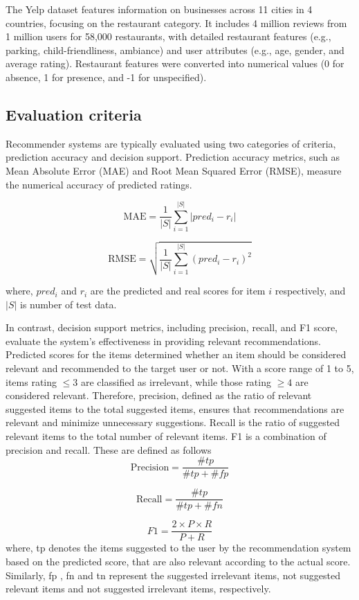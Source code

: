 \documentclass{article}
\begin{document}
The Yelp dataset features information on businesses across 11 cities in 4 countries, focusing on the restaurant category. It includes 4 million reviews from 1 million users for 58,000 restaurants, with detailed restaurant features (e.g., parking, child-friendliness, ambiance) and user attributes (e.g., age, gender, and average rating). Restaurant features were converted into numerical values (0 for absence, 1 for presence, and -1 for unspecified).

\subsection{Evaluation criteria}
Recommender systems are typically evaluated using two categories of criteria, prediction accuracy and decision support. Prediction accuracy metrics, such as Mean Absolute Error (MAE) and Root Mean Squared Error (RMSE), measure the numerical accuracy of predicted ratings. 

\begin{equation}
    \text{MAE} = \frac{1}{|S|} \sum_{i=1}^{|S|} |pred_i - r_i|
\end{equation}


\begin{equation}
    \text{RMSE} = \sqrt{\frac{1}{|S|} \sum_{i=1}^{|S|} (pred_i - r_i)^2}
\end{equation}

where, $pred_i$ and $r_i$ are the predicted and real scores for item $i$ respectively, and $|S|$ is number of test data.

In contrast, decision support metrics, including precision, recall, and F1 score, evaluate the system's effectiveness in providing relevant recommendations. Predicted scores for the items determined whether an item should be considered relevant and recommended to the target user or not. With a score range of 1 to 5, items rating $\leq 3$ are classified as irrelevant, while those rating $\geq 4$ are considered relevant. Therefore, precision, defined as the ratio of relevant suggested items to the total suggested items, ensures that recommendations are relevant and minimize unnecessary suggestions. Recall is the ratio of suggested relevant items to the total number of relevant items. F1 is a combination of precision and recall. These are defined as follows
\[
\text{Precision} = \frac{\#tp}{\#tp + \#fp}
\]

\[
\text{Recall} = \frac{\#tp}{\#tp + \#fn}
\]

\[
F1 = \frac{2 \times P \times R}{P + R}
\]
where, tp denotes the items suggested to the user by the recommendation system based on the predicted score, that are also relevant according to the actual score. Similarly, fp , fn and tn represent the suggested irrelevant items, not suggested relevant items and not suggested irrelevant items, respectively.
\end{document}
